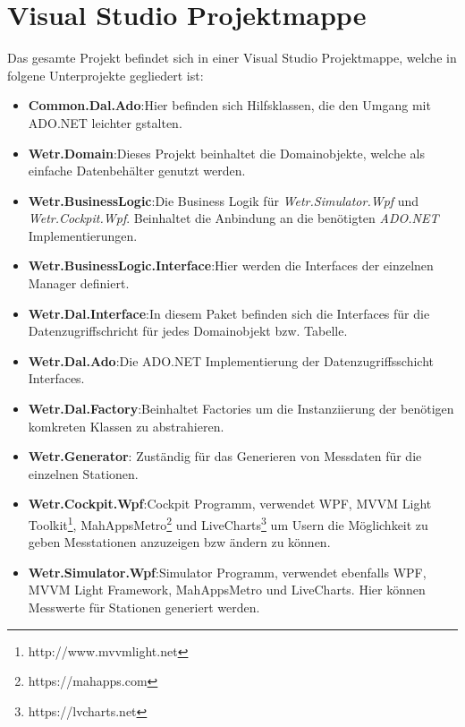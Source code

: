 \section{Visual Studio Projektmappe}

Das gesamte Projekt befindet sich in einer Visual Studio Projektmappe, welche in folgene Unterprojekte gegliedert ist:
\begin{itemize}
    \item \textbf{Common.Dal.Ado}:\newline Hier befinden sich Hilfsklassen, die den Umgang mit ADO.NET leichter gstalten.
    \item \textbf{Wetr.Domain}:\newline Dieses Projekt beinhaltet die Domainobjekte, welche als einfache Datenbehälter genutzt werden.
    \item \textbf{Wetr.BusinessLogic}:\newline Die Business Logik für \textit{Wetr.Simulator.Wpf} und \textit{Wetr.Cockpit.Wpf}. Beinhaltet die Anbindung an die benötigten \textit{ADO.NET} Implementierungen.
    \item \textbf{Wetr.BusinessLogic.Interface}:\newline Hier werden die Interfaces der einzelnen Manager definiert.
    \item \textbf{Wetr.Dal.Interface}:\newline In diesem Paket befinden sich die Interfaces für die Datenzugriffschricht für jedes Domainobjekt bzw. Tabelle.
    \item \textbf{Wetr.Dal.Ado}:\newline Die ADO.NET Implementierung der Datenzugriffsschicht Interfaces.
    \item \textbf{Wetr.Dal.Factory}:\newline Beinhaltet Factories um die Instanziierung der benötigen komkreten Klassen zu abstrahieren.
    \item \textbf{Wetr.Generator}: Zuständig für das Generieren von Messdaten für die einzelnen Stationen.
    \item \textbf{Wetr.Cockpit.Wpf}:\newline Cockpit Programm, verwendet WPF, MVVM Light Toolkit\footnote{http://www.mvvmlight.net}, MahAppsMetro\footnote{https://mahapps.com} und LiveCharts\footnote{https://lvcharts.net} um Usern die Möglichkeit zu geben Messtationen anzuzeigen bzw ändern zu können.
    \item \textbf{Wetr.Simulator.Wpf}:\newline Simulator Programm, verwendet ebenfalls WPF, MVVM Light Framework, MahAppsMetro und LiveCharts. Hier können Messwerte für Stationen generiert werden.

\end{itemize}

